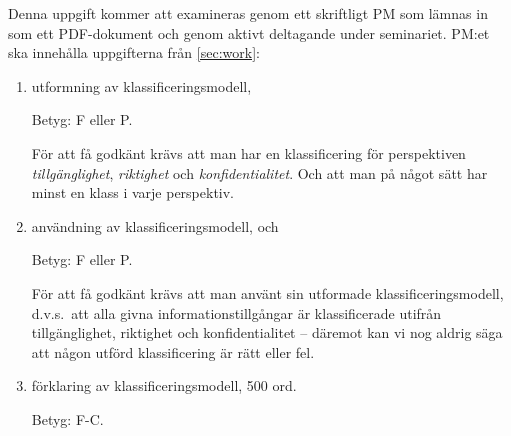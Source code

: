 \documentclass[a4paper]{llncs}
\begin{document}
Denna uppgift kommer att examineras genom ett skriftligt PM som lämnas in som 
ett PDF-dokument och genom aktivt deltagande under seminariet.
PM:et ska innehålla uppgifterna från \cref{sec:work}:
\begin{enumerate}
  \item utformning av klassificeringsmodell,
    \begin{solution}
      Betyg: F eller P.

      För att få godkänt krävs att man har en klassificering för perspektiven 
      \emph{tillgänglighet}, \emph{riktighet} och \emph{konfidentialitet}.
      Och att man på något sätt har minst en klass i varje perspektiv.
    \end{solution}

  \item användning av klassificeringsmodell, och
    \begin{solution}
      Betyg: F eller P.

      För att få godkänt krävs att man använt sin utformade 
      klassificeringsmodell, d.v.s.\ att alla givna informationstillgångar är 
      klassificerade utifrån tillgänglighet, riktighet och konfidentialitet --
      däremot kan vi nog aldrig säga att någon utförd klassificering är rätt 
      eller fel.
    \end{solution}

  \item förklaring av klassificeringsmodell, 500 ord.
    \begin{solution}
      Betyg: F-C.


\end{solution}
\end{enumerate}
\end{document}
